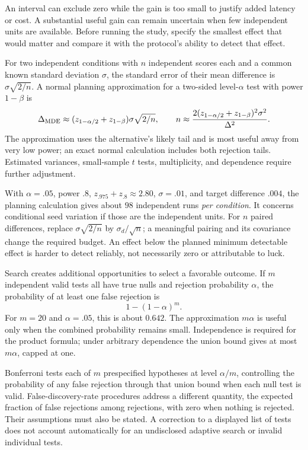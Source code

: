 An interval can exclude zero while the gain is too small to justify added latency or cost. A substantial useful gain can remain uncertain when few independent units are available. Before running the study, specify the smallest effect that would matter and compare it with the protocol's ability to detect that effect.

For two independent conditions with $n$ independent scores each and a common known standard deviation $\sigma$, the standard error of their mean difference is $\sigma\sqrt{2/n}$. A normal planning approximation for a two-sided level-$\alpha$ test with power $1-\beta$ is
\[
\Delta_{\rm MDE}\approx(z_{1-\alpha/2}+z_{1-\beta})\sigma\sqrt{2/n},
\qquad
n\approx\frac{2(z_{1-\alpha/2}+z_{1-\beta})^2\sigma^2}{\Delta^2}.
\]
The approximation uses the alternative's likely tail and is most useful away from very low power; an exact normal calculation includes both rejection tails. Estimated variances, small-sample $t$ tests, multiplicity, and dependence require further adjustment.

With $\alpha=.05$, power $.8$, $z_{.975}+z_{.8}\approx2.80$, $\sigma=.01$, and target difference $.004$, the planning calculation gives about $98$ independent runs \emph{per condition}. It concerns conditional seed variation if those are the independent units. For $n$ paired differences, replace $\sigma\sqrt{2/n}$ by $\sigma_d/\sqrt n$; a meaningful pairing and its covariance change the required budget. An effect below the planned minimum detectable effect is harder to detect reliably, not necessarily zero or attributable to luck.

Search creates additional opportunities to select a favorable outcome. If $m$ independent valid tests all have true nulls and rejection probability $\alpha$, the probability of at least one false rejection is
\[
1-(1-\alpha)^m.
\]
For $m=20$ and $\alpha=.05$, this is about $0.642$. The approximation $m\alpha$ is useful only when the combined probability remains small. Independence is required for the product formula; under arbitrary dependence the union bound gives at most $m\alpha$, capped at one.

Bonferroni tests each of $m$ prespecified hypotheses at level $\alpha/m$, controlling the probability of any false rejection through that union bound when each null test is valid. False-discovery-rate procedures address a different quantity, the expected fraction of false rejections among rejections, with zero when nothing is rejected. Their assumptions must also be stated. A correction to a displayed list of tests does not account automatically for an undisclosed adaptive search or invalid individual tests.

